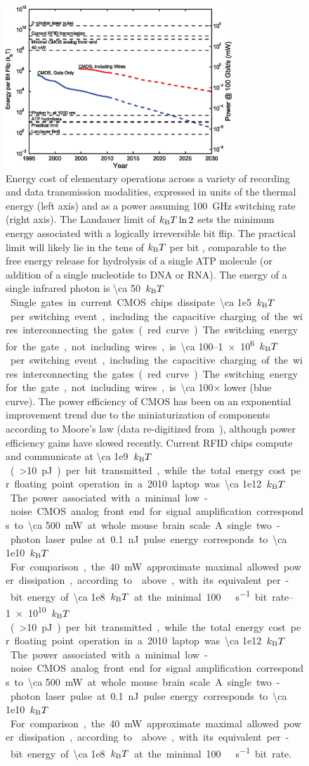 \begin{figure}[htbp]
\caption{
Energy cost of elementary operations across a variety of recording and data transmission modalities, expressed in units of the thermal energy (left axis) and as a power assuming \SI{100}{\giga\hertz} switching rate (right axis). The Landauer limit of $k_{\text{\scriptsize B}} T \ln 2$ sets the minimum energy associated with a logically irreversible bit flip. The practical limit will likely lie in the tens of $k_{\text{\scriptsize B}} T$ per bit \cite{yablonovitch08}, comparable to the free energy release for hydrolysis of a single ATP molecule (or addition of a single nucleotide to DNA or RNA). The energy of a single infrared photon is \SI{\ca 50}{$k_{\text{\scriptsize B}} T$}. Single gates in current CMOS chips dissipate \SIrange{\ca 1e5}{1e6}{$k_{\text{\scriptsize B}} T$} per switching event, including the capacitive charging of the wires interconnecting the gates (red curve). The switching energy for the gate, not including wires, is \num{\ca 100}$\times$ lower (blue curve). The power efficiency of CMOS has been on an exponential improvement trend due to the miniaturization of components according to Moore's law (data re-digitized from~\cite{tucker11}), although power efficiency gains have slowed recently. Current RFID chips compute and communicate at \SIrange{\ca 1e9}{1e10}{$k_{\text{\scriptsize B}} T$} (\SI{>10}{\pico\joule}) per bit transmitted, while the total energy cost per floating point operation in a 2010 laptop was \SI{\ca 1e12}{$k_{\text{\scriptsize B}} T$}. The power associated with a minimal low-noise CMOS analog front end for signal amplification corresponds to \SI{\ca 500}{\milli\watt} at whole mouse brain scale. A single two-photon laser pulse at \SI{0.1}{\nano\joule} pulse energy corresponds to \SI{\ca 1e10}{$k_{\text{\scriptsize B}} T$}. For comparison, the \SI{40}{\milli\watt} approximate maximal allowed power dissipation, according to  above, with its equivalent per-bit energy of \SI{\ca 1e8}{$k_{\text{\scriptsize B}} T$} at the minimal \SI{100}{\giga\bit\per\second} bit rate.
}
\label{fig:cmos}
\centering
\includegraphics[width=0.76\textwidth]{figs/Fig4.eps}
\end{figure}

